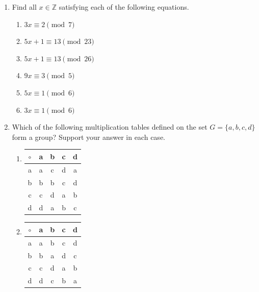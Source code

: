 {\small
\begin{enumerate}

\item
Find all $x \in {\mathbb Z}$ satisfying each of the following equations.
\begin{multicols}{2}
\begin{enumerate}

\item 
$3x \equiv 2 \pmod{ 7}$

\item
$5x + 1 \equiv 13 \pmod{ 23}$

\item
$5x + 1 \equiv 13 \pmod{ 26}$

\item
$9x \equiv 3 \pmod{ 5}$

\item
$5x \equiv 1 \pmod{ 6}$

\item
$3x \equiv 1 \pmod{ 6}$

\end{enumerate}
\end{multicols}
  

 
 \item   %
Which of the following multiplication tables defined on the set $G =
\{ a, b, c, d \}$ form a group? Support your answer in each case. 
\begin{multicols}{2}
\begin{enumerate}

\item
\begin{center}
\begin{tabular}{c|cccc}
$\circ$ & a & b & c & d \\
\hline
a & a & c & d & a \\
b & b & b & c & d \\
c & c & d & a & b \\
d & d & a & b & c
\end{tabular}
\end{center}



\item
\begin{center}
\begin{tabular}{c|cccc}
$\circ$ & a & b & c & d \\
\hline
a & a & b & c & d \\
b & b & a & d & c \\
c & c & d & a & b \\
d & d & c & b & a
\end{tabular}
\end{center}


\end{enumerate}
\end{multicols}
\end{enumerate}}
